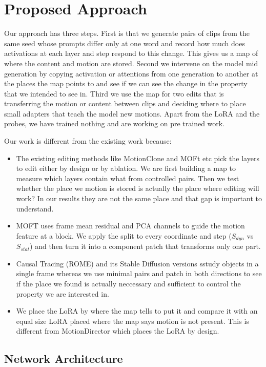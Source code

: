 \documentclass[twoside,english]{article}
\begin{document}
\section{Proposed Approach} \label{sec:our_proj}

Our approach has three steps. First is that we generate pairs of clips from the same seed 
whose prompts differ only at one word and record how much does activations at each layer and step
respond to this change. This gives us a map of where the content and motion are stored. 
Second we intervene on the model mid generation by copying activation or attentions from
one generation to another at the places the map points to and see if we can see the change in the 
property that we intended to see in. Third we use the map for two edits that is transferring the motion
or content between clips and deciding where to place small adapters that teach the model new motions.
Apart from the LoRA and the probes, we have trained nothing and are working on pre trained work. 

Our work is different from the existing work because:
\begin{itemize}
  \item The existing editing methods like MotionClone and MOFt etc pick the layers to edit either by design
  or by ablation. We are first building a map to measure which layers contain what from controlled pairs. 
  Then we test whether the place we motion is stored is actually the place where editing will work? 
  In our results they are not the same place and that gap is important to understand.
  \item MOFT uses frame mean residual and PCA channels to guide the motion feature at a block. We apply
  the split to every coordinate and step ($S_{dyn}$ vs $S_{stat}$) and then turn it into a component 
  patch that transforms only one part. 
  \item Causal Tracing (ROME) and its Stable Diffusion versions sstudy objects in a single frame whereas
  we use minimal pairs and patch in both directions to see if the place we found is 
  actually neccessary and sufficient to control the property we are interested in.
  \item We place the LoRA by where the map tells to put it and compare it with an equal size LoRA 
  placed where the map says motion is not present. This is different from MotionDirector which places the LoRA by design.
\end{itemize}

\subsection{Network Architecture}
\end{document}
